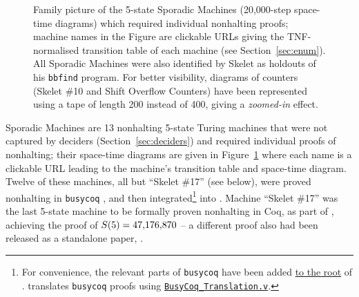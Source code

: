 \begin{figure}[t]
    \caption{{\small Family picture of the 5-state Sporadic Machines (20,000-step space-time diagrams) which required individual \Coq nonhalting proofs; machine names in the Figure are clickable URLs giving the TNF-normalised transition table of each machine (see Section~\ref{sec:enum}). All Sporadic Machines were also identified by Skelet \cite{Skelet_bbfind} as holdouts of his \texttt{bbfind} program. For better visibility, diagrams of counters (Skelet \#10 and Shift Overflow Counters) have been represented using a tape of length 200 instead of 400, giving a \textit{zoomed-in} effect.}}
    \label{fig:sporadic}
\end{figure}

Sporadic Machines are 13 nonhalting 5-state Turing machines that were not captured by deciders (Section~\ref{sec:deciders}) and required individual \Coq proofs of nonhalting; their space-time diagrams are given in Figure~\ref{fig:sporadic} where each name is a clickable URL leading to the machine's transition table and space-time diagram. Twelve of these machines, \ie all but ``Skelet \#17'' (see below), were proved nonhalting in \texttt{busycoq} \cite{busycoq}, and then integrated\footnote{For convenience, the relevant parts of \texttt{busycoq} have been added \href{https://github.com/ccz181078/Coq-BB5/tree/main/BusyCoq}{to the root} of \CoqBB. \CoqBB translates \texttt{busycoq} proofs using \href{https://github.com/ccz181078/Coq-BB5/blob/main/CoqBB5/BB5/BusyCoq_Translation.v}{\texttt{BusyCoq\_Translation.v}}.} into \CoqBB. Machine ``Skelet \#17'' was the last 5-state machine to be formally proven nonhalting in Coq, as part of \CoqBB, achieving the proof of $S(5) = 47{,}176{,}870$ -- a different proof also had been released as a standalone paper, \cite{xu2024skelet17fifthbusy}.

